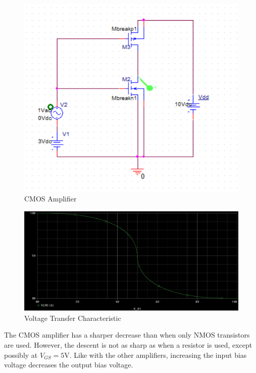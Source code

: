 \FloatBarrier

\begin{figure}[h!]
	\centering
	\includegraphics[scale=0.75]{../images/circuit4.PNG}
	\caption{CMOS Amplifier}
	\label{fig:circuit4}
\end{figure}

\FloatBarrier

\FloatBarrier

\begin{figure}[h!]
	\centering
	\includegraphics[scale=0.75]{../images/dc_sweep_vout_vs_vgs.PNG}
	\caption{Voltage Transfer Characteristic}
	\label{fig:dc_sweep_vout_vs_vgs}
\end{figure}

\FloatBarrier

The CMOS amplifier has a sharper decrease than when only NMOS transistors are used. However, the descent is not as sharp as when a resistor is used, except possibly at $V_{GS} = 5$\si{\volt}. Like with the other amplifiers, increasing the input bias voltage decreases the output bias voltage.
